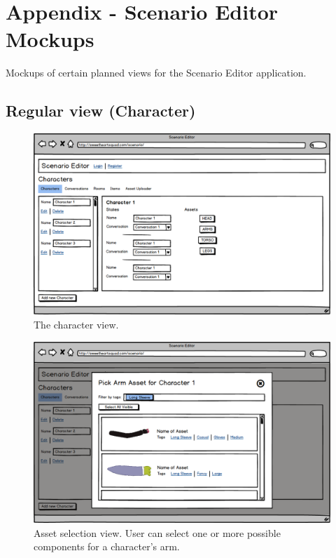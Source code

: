 \chapter{Appendix - Scenario Editor Mockups}
\label{app:mockups}
Mockups of certain planned views for the Scenario Editor application.

\section{Regular view (Character)}

\begin{figure}[H]
\centering\includegraphics[width=0.95\linewidth, height=0.7\paperheight, keepaspectratio=true]{images/Character1}
  \caption{The character view.}
  \label{fig:mockup_char_1}
\end{figure}

\begin{figure}[p]
\centering\includegraphics[width=0.95\linewidth, height=0.7\paperheight, keepaspectratio=true]{images/Character2}
  \caption{Asset selection view. User can select one or more possible components for a character's arm.}
  \label{fig:mockup_char_2}
\end{figure}

